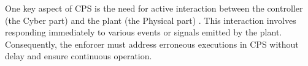 One key aspect of CPS is the need for active interaction between the controller (the Cyber part) and the plant (the Physical part) \cite{10.1145/3126500}. This interaction involves responding immediately to various events or signals emitted by the plant. Consequently, the enforcer must address erroneous executions in CPS without delay and ensure continuous operation. 

                
                



